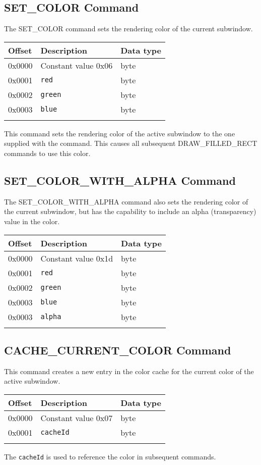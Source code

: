 \documentclass{article}
\newcommand{\field}[1]{\textcolor{fieldColor}{\texttt{#1}}}
\newenvironment{bytelisting}
{\ttfamily \begin{center} \begin{tabular}{l l l} Offset & Description & Data type \\ \hline}
{\normalfont \end{tabular} \end{center}}
\begin{document}
\subsection{SET\_COLOR Command}
The SET\_COLOR command sets the rendering color of the current subwindow.

\begin{bytelisting}
0x0000 & Constant value 0x06 & byte \\
0x0001 & \field{red} & byte \\
0x0002 & \field{green} & byte \\
0x0003 & \field{blue} & byte \\
\end{bytelisting}

This command sets the rendering color of the active subwindow to the one supplied with the command. This causes all subsequent DRAW\_FILLED\_RECT commands to use this color.

\subsection{SET\_COLOR\_WITH\_ALPHA Command}
The SET\_COLOR\_WITH\_ALPHA command also sets the rendering color of the current subwindow, but has the capability to include an alpha (transparency) value in the color.

\begin{bytelisting}
0x0000 & Constant value 0x1d & byte \\
0x0001 & \field{red} & byte \\
0x0002 & \field{green} & byte \\
0x0003 & \field{blue} & byte \\
0x0003 & \field{alpha} & byte \\
\end{bytelisting}

\subsection{CACHE\_CURRENT\_COLOR Command}
This command creates a new entry in the color cache for the current color of the active subwindow.

\begin{bytelisting}
0x0000 & Constant value 0x07 & byte \\
0x0001 & \field{cacheId} & byte \\
\end{bytelisting}

The \field{cacheId} is used to reference the color in subsequent commands.
\end{document}

